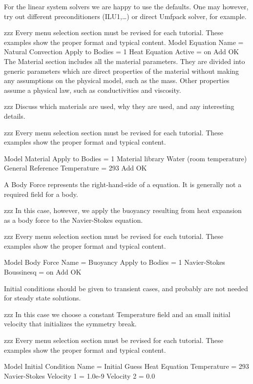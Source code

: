 For the linear system solvers we are happy to use the defaults. One may however, try out different preconditioners (ILU1,\ldots) or direct Umfpack solver, for example.

zzz Every menu selection section must be revised for each tutorial.  These examples show the proper format and typical content.
\ttbegin
Model
  Equation
   Name = Natural Convection
    Apply to Bodies = 1
    Heat Equation
      Active = on
    Add 
    OK
\ttend        
The Material section includes all the material parameters. They are divided into generic parameters which are direct properties of the material without making any assumptions on the physical model, such as the mass. Other properties assume a physical law, such as conductivities and viscosity. 

zzz Discuss which materials are used, why they are used, and any interesting details.
   
zzz Every menu selection section must be revised for each tutorial.  These examples show the proper format and typical content.

\ttbegin
Model
  Material
    Apply to Bodies = 1 
    Material library    
      Water (room temperature)
    General 
      Reference Temperature = 293
    Add
    OK
\ttend

A Body Force represents the right-hand-side of a equation. It is generally not a required field for a body. 

zzz In this case, however, we apply the buoyancy resulting from heat expansion as a body force to the Navier-Stokes equation.

zzz Every menu selection section must be revised for each tutorial.  These examples show the proper format and typical content.

\ttbegin
Model
  Body Force
    Name = Buoyancy
    Apply to Bodies = 1
    Navier-Stokes
      Boussinesq = on
    Add 
    OK
\ttend    

Initial conditions should be given to transient cases, and probably are not needed for steady state solutions. 

zzz In this case we choose a constant Temperature field and an small initial velocity that initializes the symmetry break. 

zzz Every menu selection section must be revised for each tutorial.  These examples show the proper format and typical content.

\ttbegin
Model
  Initial Condition 
    Name = Initial Guess
    Heat Equation
      Temperature = 293
    Navier-Stokes
      Velocity 1 = 1.0e-9
      Velocity 2 = 0.0
\ttend


